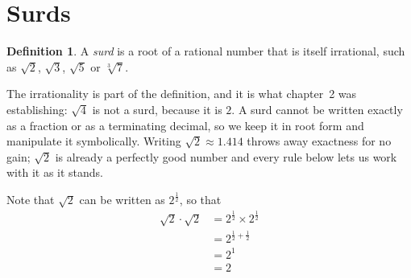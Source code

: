 \documentclass[11pt,a4paper]{article}
\theoremstyle{definition}
\newtheorem{definition}[thm]{Definition}
\begin{document}
\pagebreak
\section{Surds}
\begin{definition}
A \emph{surd} is a root of a rational number that is itself irrational, such as
$\sqrt{2}$, $\sqrt{3}$, $\sqrt{5}$ or $\sqrt[3]{7}$.
\end{definition}

The irrationality is part of the definition, and it is what chapter~2 was
establishing: $\sqrt{4}$ is not a surd, because it is $2$. A surd cannot be written
exactly as a fraction or as a terminating decimal, so we keep it in root form and
manipulate it symbolically. Writing $\sqrt{2}\approx 1.414$ throws away exactness
for no gain; $\sqrt{2}$ is already a perfectly good number and every rule below
lets us work with it as it stands.

Note that $\sqrt{2}$ can be written as $2^{\frac{1}{2}}$, so that
\begin{align*}
\sqrt{2}\cdot \sqrt{2} & = 2^{\frac{1}{2}}\times 2^{\frac{1}{2}}\\
& = 2^{\frac{1}{2}+\frac{1}{2}}\\
& = 2^1\\
& = 2\\
\end{align*}
\end{document}
